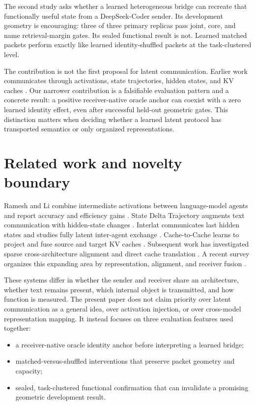 \documentclass[11pt]{article}
\begin{document}
The second study asks whether a learned heterogeneous bridge can recreate that functionally useful state from a DeepSeek-Coder sender. Its development geometry is encouraging: three of three primary replicas pass joint, core, and name retrieval-margin gates. Its sealed functional result is not. Learned matched packets perform exactly like learned identity-shuffled packets at the task-clustered level.

The contribution is not the first proposal for latent communication. Earlier work communicates through activations, state trajectories, hidden states, and KV caches \cite{ramesh2025,tang2025,du2025,fu2025,wenzel2026,heo2026}. Our narrower contribution is a falsifiable evaluation pattern and a concrete result: a positive receiver-native oracle anchor can coexist with a zero learned identity effect, even after successful held-out geometric gates. This distinction matters when deciding whether a learned latent protocol has transported semantics or only organized representations.

\section{Related work and novelty boundary}

Ramesh and Li combine intermediate activations between language-model agents and report accuracy and efficiency gains \cite{ramesh2025}. State Delta Trajectory augments text communication with hidden-state changes \cite{tang2025}. Interlat communicates last hidden states and studies fully latent inter-agent exchange \cite{du2025}. Cache-to-Cache learns to project and fuse source and target KV caches \cite{fu2025}. Subsequent work has investigated sparse cross-architecture alignment and direct cache translation \cite{wenzel2026,heo2026}. A recent survey organizes this expanding area by representation, alignment, and receiver fusion \cite{liu2026}.

These systems differ in whether the sender and receiver share an architecture, whether text remains present, which internal object is transmitted, and how function is measured. The present paper does not claim priority over latent communication as a general idea, over activation injection, or over cross-model representation mapping. It instead focuses on three evaluation features used together:

\begin{itemize}
  \item a receiver-native oracle identity anchor before interpreting a learned bridge;
  \item matched-versus-shuffled interventions that preserve packet geometry and capacity;
  \item sealed, task-clustered functional confirmation that can invalidate a promising geometric development result.
\end{itemize}
\end{document}
